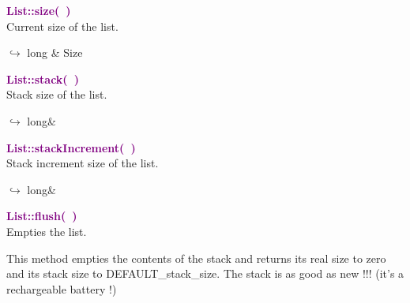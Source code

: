 \textcolor{purple}{\textbf{List::size(~)}}\label{List::size()}\\
Current size of the list.\vspace*{-0.5em}
\begin{tcolorbox}[grow to left by=-1cm, width=\textwidth-1cm,myArgs,tabularx={l|R}]
$\hookrightarrow$ long & Size
\end{tcolorbox}


\textcolor{purple}{\textbf{List::stack(~)}}\label{List::stack()}\\
Stack size of the list.\vspace*{-0.5em}
\begin{tcolorbox}[grow to left by=-1cm, width=\textwidth-1cm,myArgs,tabularx={l|R}]
$\hookrightarrow$ long&
\end{tcolorbox}


\textcolor{purple}{\textbf{List::stackIncrement(~)}}\label{List::stackIncrement()}\\
Stack increment size of the list.\vspace*{-0.5em}
\begin{tcolorbox}[grow to left by=-1cm, width=\textwidth-1cm,myArgs,tabularx={l|R}]
$\hookrightarrow$ long&
\end{tcolorbox}


\textcolor{purple}{\textbf{List::flush(~)}}\label{List::flush()}\\
Empties the list.

This method empties the contents of the stack and returns its real size to zero and its stack size to DEFAULT\_stack\_size.
The stack is as good as new !!! (it's a rechargeable battery !)

